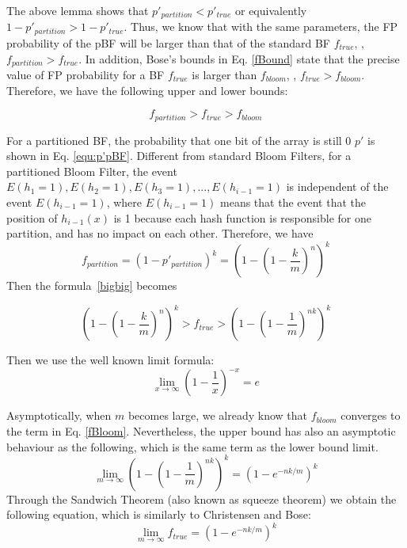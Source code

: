 The above lemma shows that $p'_{partition} < p'_{true}$ or equivalently $1-p'_{partition} > 1-p'_{true}$.
%
Thus, we know that with the same parameters, the FP probability of the pBF will be larger than that of the standard BF $f_{true}$, \ie, $f_{partition} > f_{true}$. 
%
In addition, Bose’s bounds in Eq. \ref{fBound} state that the precise value of FP probability for a BF $f_{true}$ is larger than $f_{bloom}$, \ie, $f_{true} > f_{bloom}$. 
%
Therefore, we have the following upper and lower bounds:

\begin{equation}
\label{bigbig}
f_{partition} > f_{true} > f_{bloom}
\end{equation}

For a partitioned BF, the probability that one bit of the array is still 0 $p'$ is shown in Eq. \ref{equ:p'pBF}.
%
Different from standard Bloom Filters, for a partitioned Bloom Filter, the event $E(h_1=1),E(h_2=1),E(h_3=1),...,E(h_{i-1}=1)$ is independent of the event $E(h_{i-1}=1)$, where $E(h_{i-1}=1)$ means that the event that the position of $h_{i-1}(x)$ is 1 because each hash function is responsible for one partition, and has no impact on each other. 
%
Therefore, we have
%
\begin{equation}
f_{partition}=(1-p'_{partition})^k=\left( 1- \left( 1-\dfrac{k}{m} \right)^n \right) ^k
\end{equation}
Then the formula~\ref{bigbig} becomes

\begin{equation}
\label{bounds}
\left( 1- \left( 1-\dfrac{k}{m} \right)^n \right) ^k > f_{true} > \left( 1- \left( 1-\dfrac{1}{m} \right)^{nk} \right) ^k
\end{equation}

Then we use the well known limit formula:
\begin{equation}
\lim\limits_{x \to \infty} \left( 1-\dfrac{1}{x}\right) ^{-x} = e
\end{equation}

Asymptotically, when $m$ becomes large, we already know that $f_{bloom}$ converges to the term in Eq. \ref{fBloom}. 
%
Nevertheless, the upper bound has also an asymptotic behaviour as the following, which is the same term as the lower bound limit. 
%
\begin{equation}
\label{flim}
\lim\limits_{m \to \infty} \left(1-\left(1-\frac{1}{m}\right)^{nk}\right)^k = \left(1-e^{-nk/m}\right)^k 
\end{equation}
%
Through the Sandwich Theorem (also known as squeeze theorem) we obtain the following equation, which is similarly to Christensen and Bose:
\begin{equation}
\label{flimtrue}
\lim\limits_{m \to \infty}  f_{true} =  \left(1-e^{-nk/m}\right)^k 
\end{equation}

